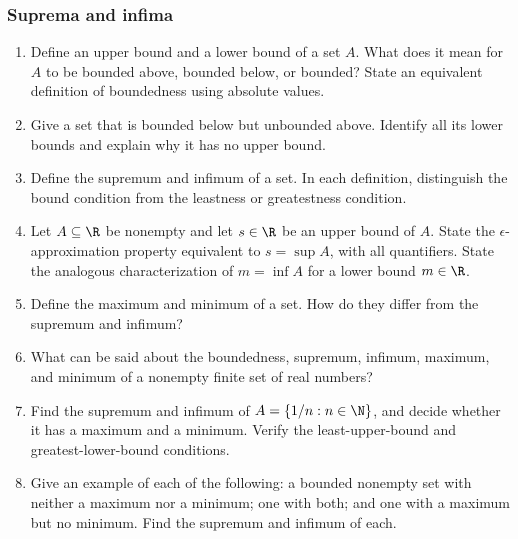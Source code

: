 \subsubsection*{Suprema and infima}
\begin{enumerate}
  \item Define an upper bound and a lower bound of a set \(A\).
    What does it mean for \(A\) to be bounded above, bounded below, or bounded?
    State an equivalent definition of boundedness using absolute values.

  \item Give a set that is bounded below but unbounded above.
    Identify all its lower bounds and explain why it has no upper bound.

  \item Define the supremum and infimum of a set. In each definition,
    distinguish the bound condition from the leastness or greatestness condition.

  \item Let \(A\subseteq\R\) be nonempty and let \(s\in\R\) be an
    upper bound of \(A\). State the \(\epsilon\)-approximation property
    equivalent to \(s=\sup A\), with all quantifiers.
    State the analogous characterization of \(m=\inf A\) for a lower
    bound \(m\in\R\).

  \item Define the maximum and minimum of a set.
    How do they differ from the supremum and infimum?

  \item What can be said about the boundedness, supremum, infimum,
    maximum, and minimum of a nonempty finite set of real numbers?

  \item Find the supremum and infimum of
    \(A=\{1/n:n\in\N\}\), and decide whether it has a maximum and a minimum.
    Verify the least-upper-bound and greatest-lower-bound conditions.

  \item Give an example of each of the following:
    a bounded nonempty set with neither a maximum nor a minimum;
    one with both; and one with a maximum but no minimum.
    Find the supremum and infimum of each.


\end{enumerate}
